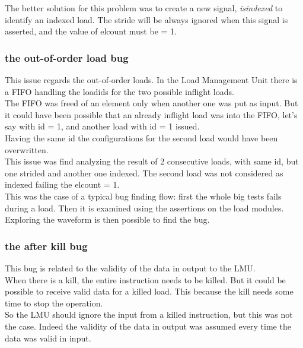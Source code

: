 The better solution for this problem was to create a new signal, \emph{is\+indexed} to identify an indexed load. The stride will be always ignored when this signal is asserted, and the value of el\+count must be = 1.\\

\subsubsection{the out-of-order load bug}
This issue regards the out-of-order loads. In the Load Management Unit there is a FIFO handling the load\+ids for the two possible inflight loads.\\

The FIFO was freed of an element only when another one was put as input. But it could have been possible that an already inflight load was into the FIFO, let's say with id = 1, and another load with id = 1 issued. \\
Having the same id the configurations for the second load would have been overwritten.\\

This issue was find analyzing the result of 2 consecutive loads, with same id, but one strided and another one indexed. The second load was not considered as indexed failing the el\+count = 1.\\

This was the case of a typical bug finding flow: first the whole big tests fails during a load. Then it is examined using the assertions on the load modules. Exploring the waveform is then possible to find the bug.\\

\subsubsection{the after kill bug}
This bug is related to the validity of the data in output to the LMU.\\

When there is a kill, the entire instruction needs to be killed. But it could be possible to receive valid data for a killed load. This because the kill needs some time to stop the operation.\\

So the LMU should ignore the input from a killed instruction, but this was not the case. Indeed the validity of the data in output was assumed every time the data was valid in input.\\

